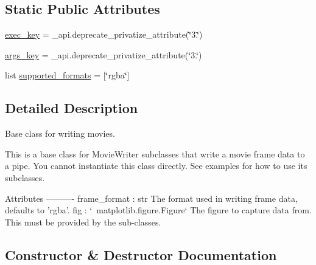 \subsection*{Static Public Attributes}
\begin{DoxyCompactItemize}
\item 
\hyperlink{classmatplotlib_1_1animation_1_1MovieWriter_a428a3acecf3218f00f563c6290402763}{exec\+\_\+key} = \+\_\+api.\+deprecate\+\_\+privatize\+\_\+attribute(\char`\"{}3.\char`\"{})
\item 
\hyperlink{classmatplotlib_1_1animation_1_1MovieWriter_a4071308167e0f5e4a530bd54f6e19527}{args\+\_\+key} = \+\_\+api.\+deprecate\+\_\+privatize\+\_\+attribute(\char`\"{}3.\char`\"{})
\item 
list \hyperlink{classmatplotlib_1_1animation_1_1MovieWriter_a299b985b271a8c409e25d1fdada37414}{supported\+\_\+formats} = \mbox{[}\char`\"{}rgba\char`\"{}\mbox{]}
\end{DoxyCompactItemize}


\subsection{Detailed Description}
\begin{DoxyVerb}Base class for writing movies.

This is a base class for MovieWriter subclasses that write a movie frame
data to a pipe. You cannot instantiate this class directly.
See examples for how to use its subclasses.

Attributes
----------
frame_format : str
    The format used in writing frame data, defaults to 'rgba'.
fig : `~matplotlib.figure.Figure`
    The figure to capture data from.
    This must be provided by the sub-classes.
\end{DoxyVerb}
 

\subsection{Constructor \& Destructor Documentation}
\mbox{\label{classmatplotlib_1_1animation_1_1MovieWriter_ae01612a4e3ba22aa48d17bec8de1bb62}} 
